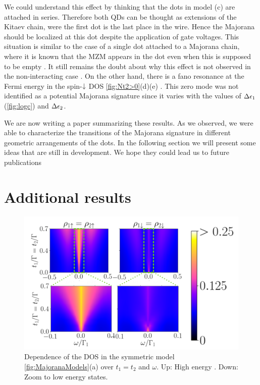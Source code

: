     We could understand this effect by thinking that the dots in model (c) are attached in series. Therefore both QDs can be thought as extensions of the Kitaev chain, were the first dot is the last place in the wire. Hence the Majorana should be localized at this dot despite the application of gate voltages. This situation is similar to the case of a single dot attached to a Majorana chain, where it is known that the MZM appears in the dot even when this is supposed to be empty \cite{vernek_subtle_2014}. It still remains the doubt about why this effect is not observed in the non-interacting case . On the other hand, there is a fano resonance at the Fermi energy in the spin-$\downarrow$ DOS  \ref{fig:Nt2>0}(d)(e) . This zero mode was not identified as a potential Majorana signature since it varies with the values of $\Delta \epsilon_1$ (\ref{fig:logc}) and $\Delta \epsilon_2$.
    

We are now writing a paper summarizing these results. As we observed, we were able to characterize the transitions of the Majorana signature in different geometric arrangements of the dots. In the following section we will present some ideas that are still in development. We hope they could lead us to future publications

\section{Additional  results}

\begin{figure}[t]
\centering
\includegraphics[scale=0.45]{IMAGES/NRG/Indirect.png}
\caption{\label{fig:indirect} Dependence of the DOS in the symmetric model \ref{fig:MajoranaModels}(a) over $t_1=t_2$ and $\omega$. Up: High energy . Down: Zoom to low energy states.  \protect\Source{}}
\end{figure}

